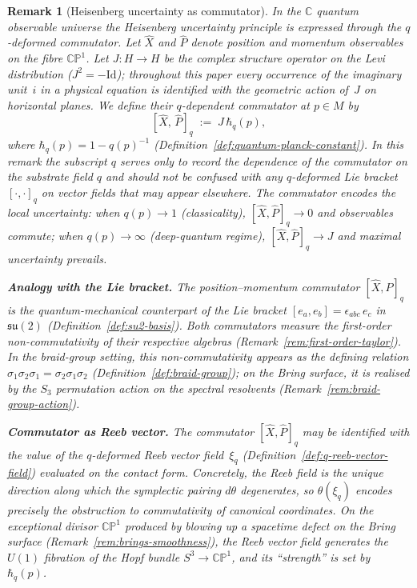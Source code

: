 \documentclass[12pt,a4paper]{report}
\newtheorem{remark}[theorem]{Remark}
\begin{document}
\begin{remark}[Heisenberg uncertainty as commutator]
\label{rem:heisenberg-commutator}
In the $\mathbb{C}$ quantum observable universe the Heisenberg uncertainty
principle is expressed through the $q$-deformed commutator.  Let $\hat{X}$ and
$\hat{P}$ denote position and momentum observables on the fibre
$\mathbb{CP}^1$.  Let $J \colon H \to H$ be the complex structure operator
on the Levi distribution ($J^2 = -\mathrm{Id}$); throughout this paper every
occurrence of the imaginary unit~$i$ in a physical equation is identified with
the geometric action of~$J$ on horizontal planes.  We define their
$q$-dependent commutator at $p \in M$ by
\[
  [\hat{X},\, \hat{P}]_q \;:=\; J\,\hbar_q(p),
\]
where $\hbar_q(p) = 1 - q(p)^{-1}$
(Definition~\ref{def:quantum-planck-constant}).  In this remark the subscript
$q$ serves only to record the dependence of the commutator on the substrate
field $q$ and should not be confused with any $q$-deformed Lie bracket
$[\cdot,\cdot]_q$ on vector fields that may appear elsewhere.  The commutator
encodes the local uncertainty: when $q(p) \to 1$ (classicality),
$[\hat{X}, \hat{P}]_q \to 0$ and observables commute; when $q(p) \to \infty$
(deep-quantum regime), $[\hat{X}, \hat{P}]_q \to J$ and maximal uncertainty
prevails.

\medskip
\noindent\textbf{Analogy with the Lie bracket.}\;
The position--momentum commutator $[\hat{X},\hat{P}]_q$ is the
quantum-mechanical counterpart of the Lie bracket
$[e_a,e_b]=\epsilon_{abc}\,e_c$ in $\mathfrak{su}(2)$
(Definition~\ref{def:su2-basis}).  Both commutators measure the
first-order non-commutativity of their respective algebras
(Remark~\ref{rem:first-order-taylor}).  In the braid-group setting,
this non-commutativity appears as the defining relation
$\sigma_1\sigma_2\sigma_1=\sigma_2\sigma_1\sigma_2$
(Definition~\ref{def:braid-group}); on the Bring surface, it is
realised by the $S_3$ permutation action on the spectral resolvents
(Remark~\ref{rem:braid-group-action}).

\medskip
\noindent\textbf{Commutator as Reeb vector.}\;
The commutator $[\hat{X},\hat{P}]_q$ may be identified with the value
of the $q$-deformed Reeb vector field~$\xi_q$
(Definition~\ref{def:q-reeb-vector-field}) evaluated on the contact
form.  Concretely, the Reeb field is the unique direction along which
the symplectic pairing $d\theta$ degenerates, so $\theta(\xi_q)$
encodes precisely the obstruction to commutativity of canonical
coordinates.  On the exceptional divisor $\mathbb{CP}^1$ produced by
blowing up a spacetime defect on the Bring surface
(Remark~\ref{rem:brings-smoothness}), the Reeb vector field generates
the $U(1)$ fibration of the Hopf bundle $S^3\to\mathbb{CP}^1$, and
its ``strength'' is set by~$\hbar_q(p)$.
\end{remark}
\end{document}
